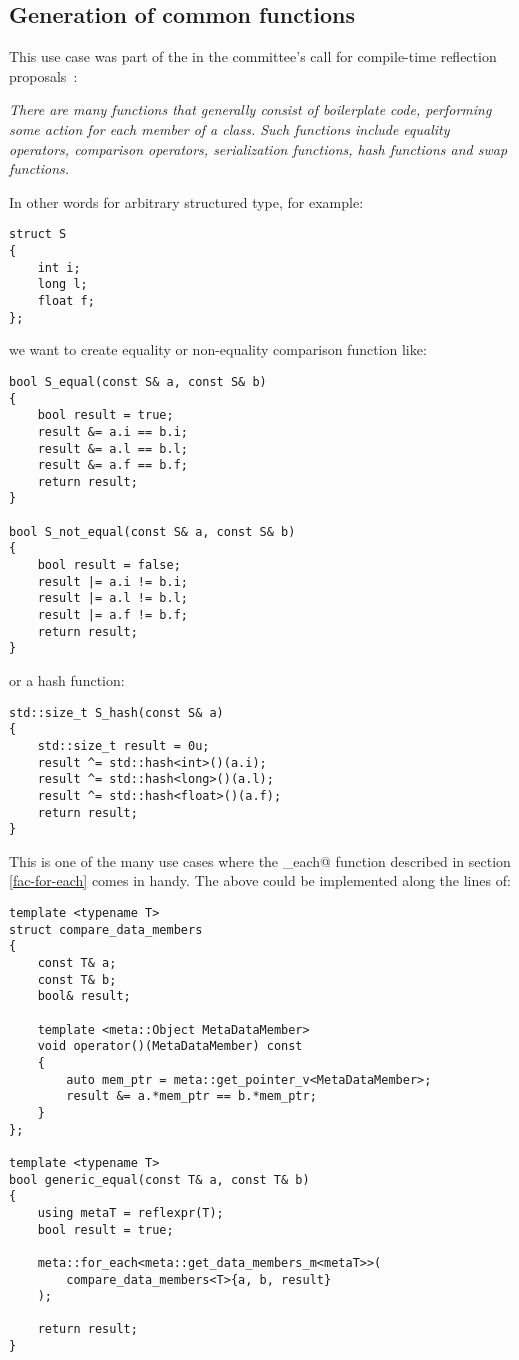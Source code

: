 \subsection{Generation of common functions}
\label{use-case-common-func}

This use case was part of the  in the committee's
call for compile-time reflection proposals~\cite{ISOCPP-N3814}: 

{\em There are many functions that generally consist of boilerplate code,
performing some action for each member of a class. Such functions include
equality operators, comparison operators, serialization functions,
hash functions and swap functions.
}

In other words for arbitrary structured type, for example:

\begin{verbatim}
struct S
{
	int i;
	long l;
	float f;
};
\end{verbatim}

we want to create equality or non-equality comparison function like:

\begin{verbatim}
bool S_equal(const S& a, const S& b)
{
	bool result = true;
	result &= a.i == b.i;
	result &= a.l == b.l;
	result &= a.f == b.f;
	return result;
}

bool S_not_equal(const S& a, const S& b)
{
	bool result = false;
	result |= a.i != b.i;
	result |= a.l != b.l;
	result |= a.f != b.f;
	return result;
}
\end{verbatim}

or a hash function:

\begin{verbatim}
std::size_t S_hash(const S& a)
{
	std::size_t result = 0u;
	result ^= std::hash<int>()(a.i);
	result ^= std::hash<long>()(a.l);
	result ^= std::hash<float>()(a.f);
	return result;
}
\end{verbatim}

This is one of the many use cases where the \verb@for_each@ function
described in section \ref{fac-for-each} comes in handy. The above could be
implemented along the lines of:

\begin{verbatim}
template <typename T>
struct compare_data_members
{
	const T& a;
	const T& b;
	bool& result;

	template <meta::Object MetaDataMember>
	void operator()(MetaDataMember) const
	{
		auto mem_ptr = meta::get_pointer_v<MetaDataMember>;
		result &= a.*mem_ptr == b.*mem_ptr;
	}
};

template <typename T>
bool generic_equal(const T& a, const T& b)
{
	using metaT = reflexpr(T);
	bool result = true;

	meta::for_each<meta::get_data_members_m<metaT>>(
		compare_data_members<T>{a, b, result}
	);

	return result;
}
\end{verbatim}

